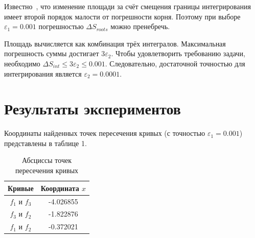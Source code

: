 \documentclass[a4paper,12pt,titlepage,final]{article}
\begin{document}
Известно~\cite{Ilyin}, что изменение площади за счёт смещения границы интегрирования имеет второй
порядок малости от погрешности корня. Поэтому при выборе $\varepsilon_1 = 0.001$
погрешностью $\Delta S_{roots}$ можно пренебречь.

Площадь вычисляется как комбинация трёх интегралов.
Максимальная погрешность суммы достигает $3 \varepsilon_2$.
Чтобы удовлетворить требованию задачи, необходимо $\Delta S_{int} \le 3 \varepsilon_2 \le 0.001$.
Следовательно, достаточной точностью для интегрирования является $\varepsilon_2 = 0.0001$.

\newpage

\section{Результаты экспериментов}
Координаты найденных точек пересечения кривых (с точностью $\varepsilon_1 = 0.001$) представлены в таблице 1.

\begin{table}[h]
\centering
\begin{tabular}{|c|c|}
\hline
\textbf{Кривые} & \textbf{Координата $x$} \\ \hline
$f_1$ и $f_3$   & -4.026855               \\ \hline
$f_3$ и $f_2$   & -1.822876               \\ \hline
$f_1$ и $f_2$   & -0.372021               \\ \hline
\end{tabular}
\caption{Абсциссы точек пересечения кривых}
\end{table}
\end{document}
